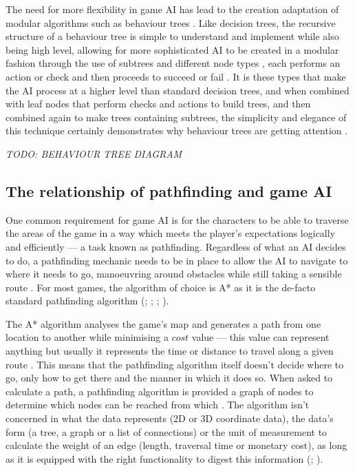 \documentclass[11pt, a4paper]{report}
\begin{document}
The need for more flexibility in game AI has lead to the creation adaptation of modular algorithms such as behaviour trees \parencite[1]{lim2010evolving}. Like decision trees, the recursive structure of a behaviour tree is simple to understand and implement while also being high level, allowing for more sophisticated AI to be created in a modular fashion through the use of subtrees and different node types \parencite[144]{shoulson2011parameterizing}, each performs an action or check and then proceeds to succeed or fail \parencite[4]{lim2010evolving}. It is these types that make the AI process at a higher level than standard decision trees, and when combined with leaf nodes that perform checks and actions to build trees, and then combined again to make trees containing subtrees, the simplicity and elegance of this technique certainly demonstrates why behaviour trees are getting attention \parencite[144]{shoulson2011parameterizing}.

\emph{TODO: BEHAVIOUR TREE DIAGRAM}

\subsection{The relationship of pathfinding and game AI}
\label{subsec:theRelationshipOfPathfindingAndGameAI}

One common requirement for game AI is for the characters to be able to traverse the areas of the game in a way which meets the player's expectations logically and efficiently --- a task known as pathfinding. Regardless of what an AI decides to do, a pathfinding mechanic needs to be in place to allow the AI to navigate to where it needs to go, manoeuvring around obstacles while still taking a sensible route \parencite[60]{graham2003pathfinding}. For most games, the algorithm of choice is A* as it is the de-facto standard pathfinding algorithm (\cite[197]{millington2019ai}; \cite[2]{botea2004near}; \cite[64]{nareyek2004ai}; \cite[73]{leigh2007using}).

The A* algorithm analyses the game's map and generates a path from one location to another while minimising a $cost$ value --- this value can represent anything but usually it represents the time or distance to travel along a given route \parencite[44]{yap2002grid}. This means that the pathfinding algorithm itself doesn't decide where to go, only how to get there and the manner in which it does so. When asked to calculate a path, a pathfinding algorithm is provided a graph of nodes to determine which nodes can be reached from which \parencite[61]{nareyek2004ai}. The algorithm isn't concerned in what the data represents (2D or 3D coordinate data), the data's form (a tree, a graph or a list of connections) or the unit of measurement to calculate the weight of an edge (length, traversal time or monetary cost), as long as it is equipped with the right functionality to digest this information (\cite[277]{millington2019ai}; \cite[60]{graham2003pathfinding}).
\end{document}
